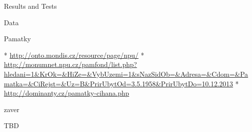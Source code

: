 \chap Results and Tests 


\sec Data
~

\secc Pamatky

\begitems
  * \url{http://onto.mondis.cz/resource/page/npu/}
  * \url{http://monumnet.npu.cz/pamfond/list.php?hledani=1&KrOk=&HiZe=&VybUzemi=1&sNazSidOb=&Adresa=&Cdom=&Pamatka=&CiRejst=&Uz=B&PrirUbytOd=3.5.1958&PrirUbytDo=10.12.2013}
  * \url{http://dominanty.cz/pamatky-cihana.php}
\enditems





\chap zaver

TBD


\bye
